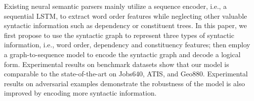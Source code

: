 Existing neural semantic parsers mainly utilize a sequence encoder, i.e., a sequential LSTM, to extract word order features while neglecting other valuable syntactic information such as dependency or constituent trees. In this paper, we first propose to use the syntactic graph to represent three types of syntactic information, i.e., word order, dependency and constituency features; then employ a graph-to-sequence model to encode the syntactic graph and decode a logical form. Experimental results on benchmark datasets show that our model is comparable to the state-of-the-art on Jobs640, ATIS, and Geo880. Experimental results on adversarial examples demonstrate the robustness of the model is also improved by encoding more syntactic information.
